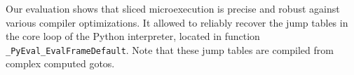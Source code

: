 Our evaluation shows that sliced microexecution is precise and robust against various compiler optimizations.
It allowed {\bcov} to reliably recover the jump tables in the core loop of the Python interpreter, located in function \texttt{\_PyEval\_EvalFrameDefault}. Note that these jump tables are compiled from complex computed gotos.

